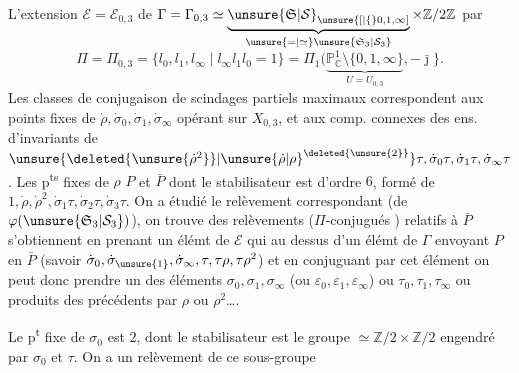 L'extension $\mathcal E=\mathcal E_{0,3}$ de $\Gamma=\Gamma_{0,3}\simeq\underbrace{\unsure{\mathfrak S|\mathcal S}_{\unsure{[|\{}0,1,\infty]}}_{\unsure{=|\simeq}\unsure{\mathfrak S_3|\mathcal S_3}}\times\mathbb Z/2\mathbb Z$
par
\[
\Pi=\Pi_{0,3}=\{l_0,l_1,l_\infty\mid l_\infty l_1l_0=1\}=\Pi_1(\underbrace{\mathbb P^1_{\mathbb C}\setminus\{0,1,\infty\}}_{U=U_{0,3}},-\bar{\jmath}\}.
\]
Les classes de conjugaison  de scindages partiels maximaux correspondent aux points fixes de $\dot\rho,\dot\sigma_0,\dot\sigma_1,\dot\sigma_\infty$ opérant sur $X_{0,3}$, et  aux comp. connexes des ens. d'invariants de $\unsure{\deleted{\unsure{\dot\rho^2}}|{\unsure{\dot\rho|\rho}}^{\deleted{\unsure{2}}}}\tau,\dot\sigma_0\tau,\dot\sigma_1\tau,\dot\sigma_\infty\tau$. Les p\textsuperscript{ts} fixes de $\rho$  $P$ et $\bar P$ dont le stabilisateur est d'ordre $6$,  formé de $1,\dot\rho,\dot\rho^2,\dot\sigma_1\tau,\dot\sigma_2\tau,\dot\sigma_3\tau$. On a étudié le relèvement correspondant  (de $\varphi(\unsure{\mathfrak S_3|\mathcal S_3})$), on trouve des relèvements ($\Pi$-conjugués ) relatifs à $\bar P$ s'obtiennent en  prenant un élémt de $\mathcal E$  qui  au dessus d'un élémt de $\Gamma$ envoyant $P$ en $\bar P$ (savoir $\dot\sigma_0,\dot\sigma_{\unsure{1}},\dot\sigma_\infty,\tau,\tau\rho,\tau\rho^2$) et en conjuguant par cet élément on peut donc prendre  un des éléments $\sigma_0,\sigma_1,\sigma_\infty$ (ou $\varepsilon_0,\varepsilon_1,\varepsilon_\infty$) ou $\tau_0,\tau_1,\tau_\infty$ ou  produits des précédents par  $\rho$ ou $\rho^2$\ldots.

Le  p\textsuperscript{t} fixe de $\sigma_0$ est $2$, dont le stabilisateur est le groupe $\simeq\mathbb Z/2\times\mathbb Z/2$ engendré par $\sigma_0$ et $\tau$. On a un relèvement de ce sous-groupe
